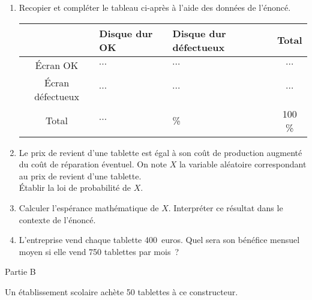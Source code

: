 \begin{enumerate}
     \item %
     Recopier et compléter le tableau ci-après à l'aide des données de l'énoncé.
     \begin{center}
          \begin{extern}%
               \renewcommand\arraystretch{1.5}
               \begin{tabular}{|c|p{2cm}|p{2cm}|c|}
                    \hline
                    $\ $ & \centering Disque dur OK & \centering Disque dur défectueux & Total \\
                    \hline
                    \'Ecran OK & \centering  $\cdots$ & \centering $\cdots$ & $\cdots$ \\
                    \hline
                    \'Ecran défectueux & \centering  $\cdots$ & \centering $\cdots$ & $\cdots$ \\
                    \hline
                    Total & \centering $\cdots$ & \centering 3\% & 100 \% \\
                    \hline
               \end{tabular}
          \end{extern}
     \end{center}
     \item %
     Le prix de revient d'une tablette est égal à son coût de production augmenté du coût de réparation éventuel.
     On note $X$ la variable aléatoire correspondant au prix de revient d'une tablette.\\
     \'Etablir la loi de probabilité de $X$.
     \item %
     Calculer l'espérance mathématique de $X$. Interpréter ce résultat dans le contexte de l'énoncé.
     \item %
     L'entreprise vend chaque tablette 400~euros. Quel sera son bénéfice mensuel moyen si elle vend 750 tablettes par mois~?
\end{enumerate}
%
\begin{center}\begin{h3}Partie B \end{h3}\end{center}
%
\par
Un établissement scolaire achète 50 tablettes à ce constructeur.
